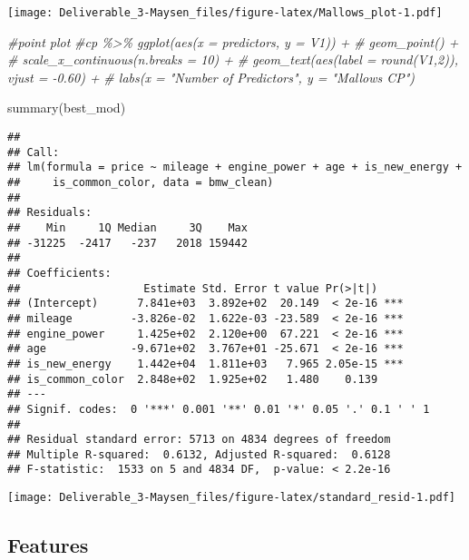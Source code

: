 \documentclass[
]{article}
\newenvironment{Shaded}{\begin{snugshade}}{\end{snugshade}}
\newcommand{\AttributeTok}[1]{\textcolor[rgb]{0.77,0.63,0.00}{#1}}
\newcommand{\CommentTok}[1]{\textcolor[rgb]{0.56,0.35,0.01}{\textit{#1}}}
\newcommand{\DecValTok}[1]{\textcolor[rgb]{0.00,0.00,0.81}{#1}}
\newcommand{\FunctionTok}[1]{\textcolor[rgb]{0.00,0.00,0.00}{#1}}
\newcommand{\NormalTok}[1]{#1}
\newcommand{\OtherTok}[1]{\textcolor[rgb]{0.56,0.35,0.01}{#1}}
\newcommand{\SpecialCharTok}[1]{\textcolor[rgb]{0.00,0.00,0.00}{#1}}
\newcommand{\StringTok}[1]{\textcolor[rgb]{0.31,0.60,0.02}{#1}}
\begin{document}
\texttt{[image: Deliverable\_3-Maysen\_files/figure-latex/Mallows\_plot-1.pdf]}

\begin{Shaded}
\begin{Highlighting}[]
\CommentTok{\#point plot}
\CommentTok{\#cp \%\textgreater{}\% ggplot(aes(x = predictors, y = V1)) + }
\CommentTok{\#   geom\_point() + }
\CommentTok{\#   scale\_x\_continuous(n.breaks = 10) +}
\CommentTok{\#   geom\_text(aes(label = round(V1,2)), vjust = {-}0.60) +}
\CommentTok{\#   labs(x = "Number of Predictors", y = "Mallow\textquotesingle{}s CP")}
\end{Highlighting}
\end{Shaded}

\begin{Shaded}
\begin{Highlighting}[]
\FunctionTok{summary}\NormalTok{(best\_mod)}
\end{Highlighting}
\end{Shaded}

\begin{verbatim}
## 
## Call:
## lm(formula = price ~ mileage + engine_power + age + is_new_energy + 
##     is_common_color, data = bmw_clean)
## 
## Residuals:
##    Min     1Q Median     3Q    Max 
## -31225  -2417   -237   2018 159442 
## 
## Coefficients:
##                   Estimate Std. Error t value Pr(>|t|)    
## (Intercept)      7.841e+03  3.892e+02  20.149  < 2e-16 ***
## mileage         -3.826e-02  1.622e-03 -23.589  < 2e-16 ***
## engine_power     1.425e+02  2.120e+00  67.221  < 2e-16 ***
## age             -9.671e+02  3.767e+01 -25.671  < 2e-16 ***
## is_new_energy    1.442e+04  1.811e+03   7.965 2.05e-15 ***
## is_common_color  2.848e+02  1.925e+02   1.480    0.139    
## ---
## Signif. codes:  0 '***' 0.001 '**' 0.01 '*' 0.05 '.' 0.1 ' ' 1
## 
## Residual standard error: 5713 on 4834 degrees of freedom
## Multiple R-squared:  0.6132, Adjusted R-squared:  0.6128 
## F-statistic:  1533 on 5 and 4834 DF,  p-value: < 2.2e-16
\end{verbatim}

\begin{Shaded}
\end{Shaded}

\texttt{[image: Deliverable\_3-Maysen\_files/figure-latex/standard\_resid-1.pdf]}

\hypertarget{features}{%
\subsection{Features}\label{features}}
\end{document}
